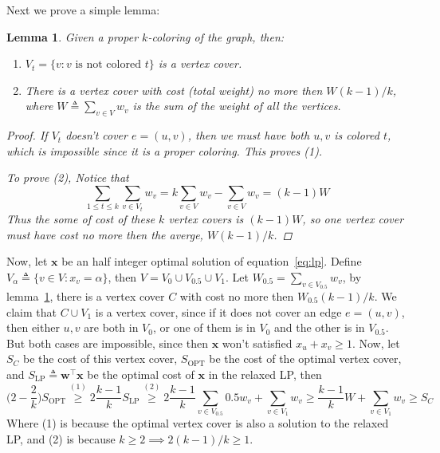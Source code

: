 \documentclass[12pt, a4paper]{article}
\newtheorem{lemma}{Lemma}
\newcommand{\defeq}{\triangleq}
\begin{document}
Next we prove a simple lemma:

\begin{lemma} \label{lemma:kcolor}
  Given a proper $k$-coloring of the graph, then:
  \begin{enumerate}[topsep=-2pt, label=(\arabic*)]
    \item $V_t = \{ v : v \text{ is not colored } t\}$ is a vertex cover.
    \item There is a vertex cover with cost (total weight) no more then $W (k-1) / k$,
      where $W \defeq \sum_{v \in V} w_v$ is the sum of the weight of all the vertices.
  \end{enumerate}

  \begin{proof}
    If $V_t$ doesn't cover $e = (u, v)$, then we must have both $u, v$ is colored $t$, which
    is impossible since it is a proper coloring. This proves (1).

    To prove (2), Notice that
    \[ \sum_{1 \leq t \leq k} \sum_{v \in V_t} w_v = k \sum_{v \in V} w_v - \sum_{v \in V} w_v = (k-1) W\]
    Thus the some of cost of these $k$ vertex covers is $(k-1)W$, so one vertex cover must have cost
    no more then the averge, $W (k-1)/k$.
  \end{proof}
\end{lemma}

Now, let $\bm{x}$ be an half integer optimal solution of equation~\ref{eq:lp}.
Define $V_\alpha \defeq \{ v \in V : x_v = \alpha \}$, then $V = V_0 \cup V_{0.5} \cup V_1$.
Let $W_{0.5} = \sum_{v \in V_{0.5}} w_v$, by lemma~\ref{lemma:kcolor}, there is a vertex
cover $C$ with cost no more then $W_{0.5} (k-1) / k$. We claim that $C \cup V_1$ is a vertex
cover, since if it does not cover an edge $e = (u, v)$, then either $u, v$ are both in $V_0$,
or one of them is in $V_0$ and the other is in $V_{0.5}$. But both cases are impossible,
since then $\bm{x}$ won't satisfied $x_u + x_v \geq 1$.
Now, let $S_C$ be the cost of this vertex cover, $S_{\text{OPT}}$ be the cost of the optimal vertex cover,
and $S_{\text{LP}} \defeq \bm{w}^\intercal \bm{x}$ be the optimal cost of $\bm{x}$ in the relaxed LP, then
\[ \Big(2 - \frac{2}{k}\Big) S_{\text{OPT}}
  \stackrel{(1)}{\geq} 2 \frac{k-1}{k} S_{\text{LP}}
  \stackrel{(2)}{\geq} 2 \frac{k-1}{k} \sum_{v \in V_{0.5}} 0.5 w_v + \sum_{v \in V_1} w_v
  \geq \frac{k-1}{k} W + \sum_{v \in V_1} w_v
  \geq S_C \]
Where (1) is because the optimal vertex cover is also a solution to the relaxed LP, and
(2) is because $k \geq 2 \implies 2(k-1)/k \geq 1$.
\end{document}
